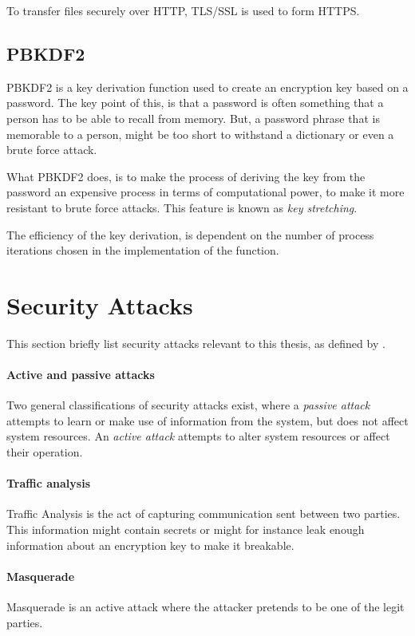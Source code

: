 \documentclass[pdftex,english,10pt,b5paper,twoside]{book}
\begin{document}
To transfer files securely over \ac{HTTP}, \ac{TLS}/\ac{SSL} is used to form
\ac{HTTPS}. 

\subsection{PBKDF2}
\label{sec:PBKDF2}

\ac{PBKDF2} is a key derivation function used to create an encryption key based
on a password. The key point of this, is that a password is often something
that a person has to be able to recall from memory. But, a password phrase that
is memorable to a person, might be too short to withstand a dictionary or even
a brute force attack.

What \ac{PBKDF2} does, is to make the process of deriving the key from the password
an expensive process in terms of computational power, to make it more resistant
to brute force attacks. This feature is known as \emph{key stretching}. 

The efficiency of the key derivation, is dependent on the number of process
iterations chosen in the implementation of the function.

\section{Security Attacks}

This section briefly list security attacks relevant to this thesis, as defined
by \citet[Ch. 1.3]{stallings}.

\paragraph{Active and passive attacks} Two general classifications of security
attacks exist, where a \emph{passive attack} attempts to learn or make use of
information from the system, but does not affect system resources. An
\emph{active attack} attempts to alter system resources or affect their
operation.

\paragraph{Traffic analysis} Traffic Analysis is the act of capturing
communication sent between two parties. This information might contain secrets
or might for instance leak enough information about an encryption key to make
it breakable.

\paragraph{Masquerade} Masquerade is an active attack where the attacker pretends to be
one of the legit parties.
\end{document}

